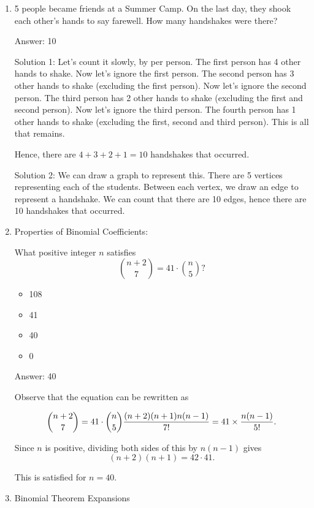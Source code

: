 \documentclass{article}
\begin{document}
\begin{enumerate}
    \item 5 people became friends at a Summer Camp. On the last day, they shook each other's hands to say farewell. How many handshakes were there?
    
    Answer: 10
    
    Solution 1: Let's count it slowly, by per person. 
    The first person has 4 other hands to shake. Now let's ignore the first person. 
    The second person has 3 other hands to shake (excluding the first person). Now let's ignore the second person. 
    The third person has 2 other hands to shake (excluding the first and second person). Now let's ignore the third person. 
    The fourth person has 1 other hands to shake (excluding the first, second and third person). This is all that remains.
    
    Hence, there are  \( 4 + 3 + 2 + 1 = 10 \) handshakes that occurred.
    
    Solution 2: We can draw a graph to represent this. There are 5 vertices representing each of the students. Between each vertex, we draw an edge to represent a handshake. We can count that there are 10 edges, hence there are 10 handshakes that occurred.


    \item Properties of Binomial Coefficients:
    
    What positive integer  \(n\) satisfies
     \[{{n+2} \choose 7}=41 \cdot {n \choose 5}?\]
 
 
    \begin{itemize}
        \item 108
        \item 41
        \item 40
        \item 0
    \end{itemize}
    Answer: 40
    
    Observe that the equation can be rewritten as

     \[{{n+2} \choose 7} =41 \cdot {n \choose 5} \\ \frac{(n+2)(n+1)n(n-1)}{7!} =41 \times \frac{n(n-1)}{5!}.\]
    
    Since  \(n\) is positive, dividing both sides of this by  \(n(n-1)\) gives
     \[(n+2)(n+1) =42 \cdot 41.\]

    This is satisfied for  \(n=40\).
    
    \item Binomial Theorem Expansions
    

\end{enumerate}
\end{document}
